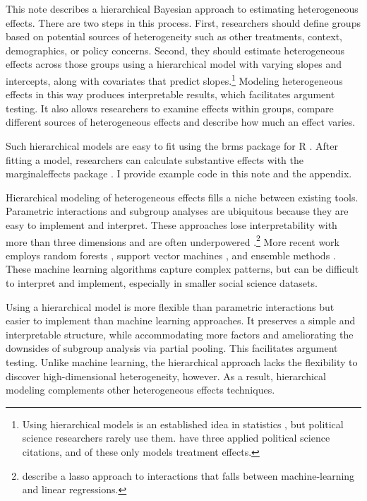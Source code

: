 \documentclass[12pt]{article}
\begin{document}
This note describes a hierarchical Bayesian approach to estimating heterogeneous effects. 
There are two steps in this process. 
First, researchers should define groups based on potential sources of heterogeneity such as other treatments, context, demographics, or policy concerns. 
Second, they should estimate heterogeneous effects across those groups using a hierarchical model with varying slopes and intercepts, along with covariates that predict slopes.\footnote{Using hierarchical models is an established idea in statistics \citep{FellerGelman2015}, but political science researchers rarely use them. \citet{FellerGelman2015} have three applied political science citations, and of these only \citet{Marquardt2022} models treatment effects.} 
Modeling heterogeneous effects in this way produces interpretable results, which facilitates argument testing.
It also allows researchers to examine effects within groups, compare different sources of heterogeneous effects and describe how much an effect varies.  


Such hierarchical models are easy to fit using the brms package for \textsf{R} \citep{Buerkner2017}. 
After fitting a model, researchers can calculate substantive effects with the marginaleffects package \citep{ArelBundockme}.
I provide example code in this note and the appendix.


Hierarchical modeling of heterogeneous effects fills a niche between existing tools.
Parametric interactions and subgroup analyses are ubiquitous because they are easy to implement and interpret.
These approaches lose interpretability with more than three dimensions and are often underpowered \citep{Simmonsetal2011}.\footnote{\citet{BlackwellOlson2022} describe a lasso approach to interactions that falls between machine-learning and linear regressions.}
More recent work employs random forests \citep{GreenKern2012, WagerAthey2018}, support vector machines \citep{ImaiRatkovic2013}, and ensemble methods \citep{Grimmeretal2017, Kuenzeletal2019, Dorieetal2022}.
These machine learning algorithms capture complex patterns, but can be difficult to interpret and implement, especially in smaller social science datasets. 

 
Using a hierarchical model is more flexible than parametric interactions but easier to implement than machine learning approaches.  
It preserves a simple and interpretable structure, while accommodating more factors and ameliorating the downsides of subgroup analysis via partial pooling. 
This facilitates argument testing.
Unlike machine learning, the hierarchical approach lacks the flexibility to discover high-dimensional heterogeneity, however.  
As a result, hierarchical modeling complements other heterogeneous effects techniques. 
\end{document}
